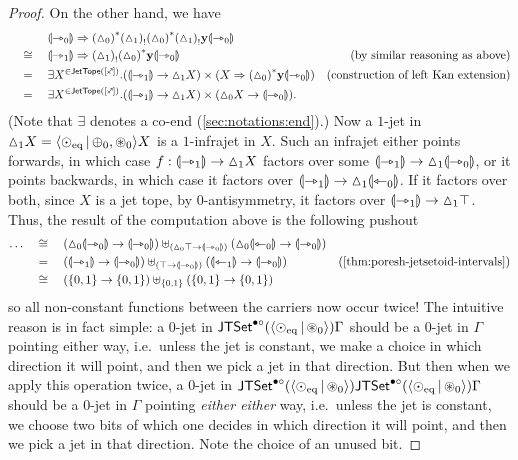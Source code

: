 \documentclass[a4paper]{memoir}
\begin{document}
\begin{proof}
	On the other hand, we have
	\begin{align*}
		&\quad\mathrel{\phantom{=}}\quad
		\DSub{\rival{\jetsym_0}}{\fpsh{(\cohdisc_0)} \lpsh{(\cohdisc_1)} \fpsh{(\cohdisc_0)} \lpsh{(\cohdisc_1)} \yoneda \rival{\jetsym_0}} \\
		&\quad\cong\quad \DSub{\rival{\jetsym_1}}{\lpsh{(\cohdisc_1)} \fpsh{(\cohdisc_0)} \yoneda \rival{\jetsym_0}}
		& \text{(by similar reasoning as above)} \\
		&\quad=\quad
		\exists X^{{}\in \jettope{[\ypolar]}}.(\rival{\jetsym_1} \to \cohdisc_1 X) \times (\DSub{X}{\fpsh{(\cohdisc_0)} \yoneda \rival{\jetsym_0}})
		& \text{(construction of left Kan extension)} \\
		&\quad=\quad
		\exists X^{{}\in \jettope{[\ypolar]}}.(\rival{\jetsym_1} \to \cohdisc_1 X) \times (\cohdisc_0 X \to \rival{\jetsym_0}).
	\end{align*}
	(Note that $\exists$ denotes a co-end (\cref{sec:notations:end}).)
	Now a $1$-jet in ${\vartriangle}_1 X = \mathopen{}\left\langle {\odot}_{\mathrm{eq}} \,\middle|\, {\oplus}_0, {\oast}_0 \right\rangle\mathclose{} X$ is a $1$-infrajet in $X$. Such an infrajet either points forwards, in which case $f : {\llparenthesis {\rightarrowtriangle}_1 \rrparenthesis} \to {\vartriangle}_1 X$ factors over some ${\llparenthesis {\rightarrowtriangle}_1 \rrparenthesis} \to {\vartriangle}_1 {\llparenthesis {\rightarrowtriangle}_0 \rrparenthesis}$, or it points backwards, in which case it factors over ${\llparenthesis {\rightarrowtriangle}_1 \rrparenthesis} \to {\vartriangle}_1 {\llparenthesis {\leftarrowtriangle}_0 \rrparenthesis}$.
	If it factors over both, since $X$ is a jet tope, by $0$-antisymmetry, it factors over ${\llparenthesis {\rightarrowtriangle}_1 \rrparenthesis} \to {\vartriangle}_1 \top$.
	Thus, the result of the computation above is the following pushout
	\begin{align*}
		\ldots &\quad\cong\quad
		(\cohdisc_0 \rival{\jetsym_0} \to \rival{\jetsym_0}) \uplus_{(\cohdisc_0 \top \to \rival{\jetsym_0})} (\cohdisc_0 \rival{\tejsym_0} \to \rival{\jetsym_0}) \\
		&\quad=\quad (\rival{\jetsym_1} \to \rival{\jetsym_0}) \uplus_{(\top \to \rival{\jetsym_0})} (\rival{\tejsym_1} \to \rival{\jetsym_0})
		& \text{(\cref{thm:poresh-jetsetoid-intervals})} \\
		&\quad\cong\quad (\accol{0,1} \to \accol{0, 1}) \uplus_{\accol{0, 1}} (\accol{0,1} \to \accol{0, 1})
	\end{align*}
	so all non-constant functions between the carriers now occur twice!
	The intuitive reason is in fact simple: a $0$-jet in $\mathsf{JTSet}^{\bullet \circ}(\mathopen{}\left\langle {\odot}_{\mathrm{eq}} \,\middle|\, {\oast}_0 \right\rangle\mathclose{}) \Gamma$ should be a $0$-jet in $\Gamma$ pointing either way, i.e.\ unless the jet is constant, we make a choice in which direction it will point, and then we pick a jet in that direction.
	But then when we apply this operation twice, a $0$-jet in $\mathsf{JTSet}^{\bullet \circ}(\mathopen{}\left\langle {\odot}_{\mathrm{eq}} \,\middle|\, {\oast}_0 \right\rangle\mathclose{}) \mathsf{JTSet}^{\bullet \circ}(\mathopen{}\left\langle {\odot}_{\mathrm{eq}} \,\middle|\, {\oast}_0 \right\rangle\mathclose{}) \Gamma$  should be a $0$-jet in $\Gamma$ pointing \emph{either either} way, i.e.\ unless the jet is constant, we choose two bits of which one decides in which direction it will point, and then we pick a jet in that direction.
	Note the choice of an unused bit.
	

\end{proof}
\end{document}
